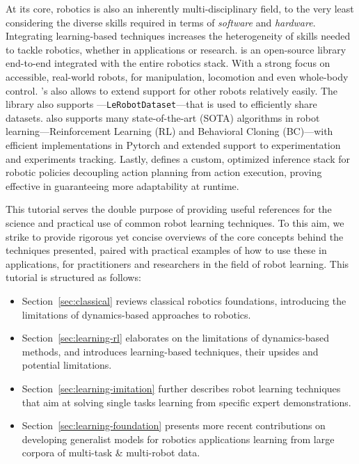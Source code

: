 At its core, robotics is also an inherently multi-disciplinary field, to the very least considering the diverse skills required in terms of \emph{software} and \emph{hardware}.
Integrating learning-based techniques increases the heterogeneity of skills needed to tackle robotics, whether in applications or research.
\lerobot is an open-source library end-to-end integrated with the entire robotics stack.
With a strong focus on accessible, real-world robots,  for manipulation, locomotion and even whole-body control. 
\lerobot's  also allows to extend support for other robots relatively easily. 
The library also supports ---\texttt{LeRobotDataset}---that is used to efficiently share datasets. 
\lerobot also supports many state-of-the-art (SOTA) algorithms in robot learning---Reinforcement Learning (RL) and Behavioral Cloning (BC)---with efficient implementations in Pytorch and extended support to experimentation and experiments tracking.
Lastly, \lerobot defines a custom, optimized inference stack for robotic policies decoupling action planning from action execution, proving effective in guaranteeing more adaptability at runtime.

This tutorial serves the double purpose of providing useful references for the science and practical use of common robot learning techniques.
To this aim, we strike to provide rigorous yet concise overviews of the core concepts behind the techniques presented, paired with practical examples of how to use these in applications, for practitioners and researchers in the field of robot learning.
This tutorial is structured as follows:
\begin{itemize}
\item Section~\ref{sec:classical} reviews classical robotics foundations, introducing the limitations of dynamics-based approaches to robotics.
\item Section~\ref{sec:learning-rl} elaborates on the limitations of dynamics-based methods, and introduces learning-based techniques, their upsides and potential limitations.
\item Section~\ref{sec:learning-imitation} further describes robot learning techniques that aim at solving single tasks learning from specific expert demonstrations.
\item Section~\ref{sec:learning-foundation} presents more recent contributions on developing generalist models for robotics applications learning from large corpora of multi-task \& multi-robot data.
\end{itemize}

